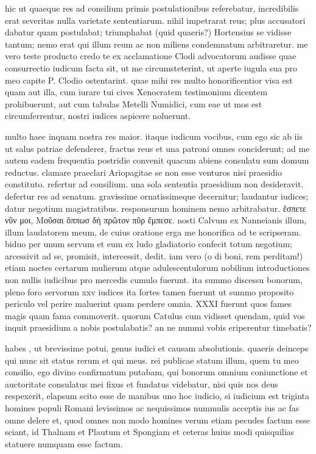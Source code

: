  hic ut quaeque res ad consilium primis postulationibus referebatur, incredibilis erat severitas nulla varietate sententiarum. nihil impetrarat reus; plus accusatori dabatur quam postulabat; triumphabat (quid quaeris?) Hortensius se vidisse tantum; nemo erat qui illum reum ac non miliens condemnatum arbitraretur. me vero teste producto credo te ex acclamatione Clodi advocatorum audisse quae consurrectio iudicum facta sit, ut me circumsteterint, ut aperte iugula sua pro meo capite P. Clodio ostentarint. quae mihi res multo honorificentior visa est quam aut illa, cum iurare tui cives Xenocratem testimonium dicentem prohibuerunt, aut cum tabulas Metelli Numidici, cum eae ut mos est circumferrentur, nostri iudices aspicere noluerunt.

 multo haec inquam nostra res maior. itaque iudicum vocibus, cum ego sic ab iis ut salus patriae defenderer, fractus reus et una patroni omnes conciderunt; ad me autem eadem frequentia postridie convenit quacum abiens consulatu sum domum reductus. clamare praeclari Ariopagitae se non esse venturos nisi praesidio constituto. refertur ad consilium. una sola sententia praesidium non desideravit. defertur res ad senatum. gravissime ornatissimeque decernitur; laudantur iudices; datur negotium magistratibus. responsurum hominem nemo arbitrabatur. ἔσπετε νῦν μοι, Μοῦσαι ὅππωσ δὴ πρῶτον πῦρ ἔμπεσε. nosti Calvum ex Nanneianis illum, illum laudatorem meum, de cuius oratione erga me honorifica ad te scripseram. biduo per unum servum et eum ex ludo gladiatorio confecit totum negotium; arcessivit ad se, promisit, intercessit, dedit. iam vero (o di boni, rem perditam!) etiam noctes certarum mulierum atque adulescentulorum nobilium introductiones non nullis iudicibus pro mercedis cumulo fuerunt. ita summo discessu bonorum, pleno foro servorum xxv iudices ita fortes tamen fuerunt ut summo proposito periculo vel perire maluerint quam perdere omnia. XXXI fuerunt quos fames magis quam fama commoverit. quorum Catulus cum vidisset quendam, quid vos inquit praesidium a nobis postulabatis? an ne nummi vobis eriperentur timebatis?

 habes , ut brevissime potui, genus iudici et causam absolutionis. quaeris deinceps qui nunc sit status rerum et qui meus. rei publicae statum illum, quem tu meo consilio, ego divino confirmatum putabam, qui bonorum omnium coniunctione et auctoritate consulatus mei fixus et fundatus videbatur, nisi quis nos deus respexerit, elapsum scito esse de manibus uno hoc iudicio, si iudicium est triginta homines populi Romani levissimos ac nequissimos nummulis acceptis ius ac fas omne delere et, quod omnes non modo homines verum etiam pecudes factum esse sciant, id Thalnam et Plautum et Spongiam et ceteras huius modi quisquilias statuere numquam esse factum.

